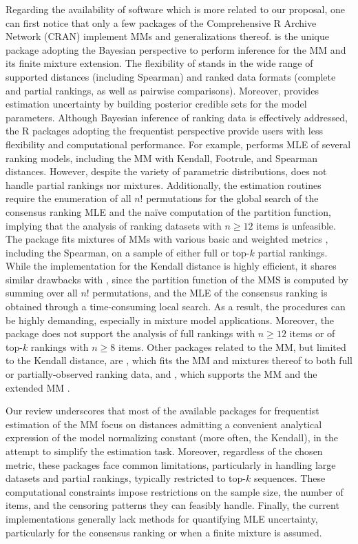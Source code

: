 {Regarding the availability of software which is more related to our proposal, one can first notice that only a few packages of the Comprehensive R Archive Network (CRAN) implement MMs and generalizations thereof.
}
 \citep{BayesMallows} is the unique package adopting the Bayesian perspective to perform inference for the MM and its finite mixture extension.
The flexibility of  stands in the wide range of supported distances (including Spearman) and ranked data formats (complete and partial rankings, as well as pairwise comparisons). Moreover,  provides estimation uncertainty by building posterior credible sets for the model parameters. Although Bayesian inference of ranking data is effectively addressed, the \textsf{R} packages adopting the frequentist perspective provide users with less flexibility and computational performance. For example,  \citep{pmr_R} performs MLE of several ranking models, including the MM with Kendall, Footrule, and Spearman distances.
However, despite the variety of parametric distributions,  does not handle partial rankings nor mixtures.
Additionally, the estimation routines require the enumeration of all $n!$ permutations for the global search of the consensus ranking MLE and the naïve computation of the partition function, implying that the analysis of ranking datasets with $n\geq 12$ items is unfeasible.
The  package \citep{rankdist} fits mixtures of MMs with various basic and weighted metrics \citep{lee2012mixtures}, including the Spearman, on a sample of either full or top-$k$ partial rankings. While the implementation for the Kendall distance is highly efficient, it shares similar drawbacks with
, since the partition function of the MMS is computed by summing over all $n!$ permutations, and the MLE of the consensus ranking is obtained through a time-consuming
local search.
As a result, the procedures can be highly demanding, especially in mixture model applications. Moreover, the package does not support the analysis of full rankings with $n\geq12$ items or of top-$k$ rankings with $n\geq8$ items. Other packages related to the MM, but limited to the Kendall distance, are  \citep{rmallow}, which fits the MM and mixtures thereof to both full or partially-observed ranking data, and  \citep{extmallows}, which supports the MM and the extended MM \citep{EMMjasa}.

Our review underscores that most of the available packages for frequentist estimation of the MM focus on distances admitting a convenient analytical expression of the model normalizing constant (more often, the Kendall), in the attempt to simplify the estimation task.
Moreover, regardless of the chosen metric, these packages face common limitations, particularly in handling large datasets and partial rankings, typically restricted to top-$k$ sequences. These computational constraints impose restrictions on the sample size, the number of items, and the censoring patterns they can feasibly handle. Finally, the current implementations generally lack methods for quantifying MLE uncertainty, particularly for the consensus ranking or when a finite mixture is assumed.

